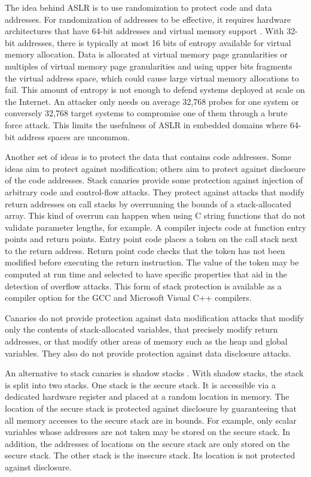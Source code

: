 The idea behind ASLR is to use randomization to protect
code and data addresses.  For randomization of addresses to be effective, 
it requires hardware  architectures that have 64-bit addresses and 
virtual memory support \cite{Shacham2004}.  With 32-bit addresses, 
there is typically  at most 16 bits of entropy available for
virtual memory allocation.  Data is allocated at virtual memory
page granularities or multiples of virtual memory page granularities
and using upper bits fragments the virtual address space, which
could cause large virtual memory allocations to fail.  This
amount of entropy is not enough to defend systems deployed at scale on
the Internet.  An attacker only needs on average 32,768 probes for one system or 
conversely 32,768 target systems to compromise one of them through a
brute force attack.
This limits the usefulness of ASLR in embedded domains where 
64-bit address spaces are uncommon.  

Another set of ideas is to protect the data that contains 
code addresses.  Some ideas aim to protect against modification;
others aim to protect against disclosure of the code addresses.
Stack canaries \cite{Cowan1998, Dang2015, Petsios2015} provide 
some protection against injection of 
arbitrary code and control-flow attacks.
They protect against attacks that modify return addresses
on call stacks by overrunning the bounds of a stack-allocated array.  
This kind of overrun can happen when using C string functions that do
not validate parameter lengths, for example.   A
compiler injects code at function entry points and return
points. Entry point code places a token on the call stack
next to the return address.  Return point code checks that
the token has not been modified before executing the return
instruction.  The value of the token may be computed at run time
and selected to have specific properties that aid in the detection
of overflow attacks.  This form of stack protection is available as a
compiler option for the GCC and Microsoft Visual C++ compilers.

Canaries do not provide protection against data modification attacks
that modify only the contents of stack-allocated variables, that
precisely modify return addresses, or that modify other areas 
of memory such as the heap and global variables. They also do not
provide protection against data disclosure attacks. 

An alternative to stack canaries is shadow stacks \cite{Abadi2005, 
Baratloo2000, Bhatkar2005, Chiueh2001, Corliss2005, Erlingsson2006,
Frantzen2001, Kuznetsov2014}.
With shadow stacks,
the stack is split into two stacks.  One stack is the secure stack. It
is accessible via a dedicated hardware register and placed at a random
location in memory.   The location of the secure stack is protected
against disclosure by guaranteeing that all memory accesses
to the secure stack are in bounds.  For example, only scalar variables whose
addresses are not taken may be stored on the secure stack. In addition, 
the addresses of locations on the secure stack are only stored on the secure
stack.   The other stack is the insecure stack.  Its location is not
protected against disclosure.

